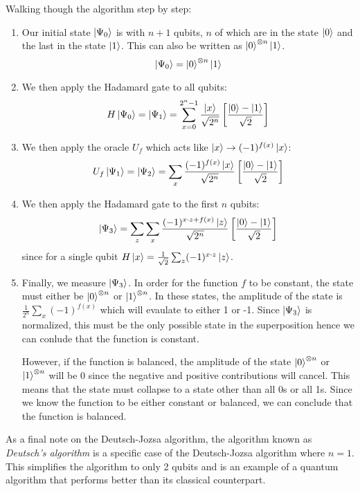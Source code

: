\documentclass[reqno]{amsart}
\numberwithin{equation}{section}
\numberwithin{figure}{section}
\begin{document}
\begin{justify}
Walking though the algorithm step by step:
    \begin{enumerate}
        \item Our initial state $\ket{\Psi_{0}}$ is with $n+1$ qubits, $n$ of which are in the state $\ket{0}$ and the last in the state $\ket{1}$. This can also be written as $\ket{0}^{\otimes n}\ket{1}$.
            \begin{equation}
                \ket{\Psi_{0}} = \ket{0}^{\otimes n}\ket{1}
            \end{equation}
        \item We then apply the Hadamard gate to all qubits:
            \begin{equation}
                H\ket{\Psi_{0}} = \ket{\Psi_{1}} = \sum\limits_{x=0}^{2^{n}-1}\frac{\ket{x}}{\sqrt{2^{n}}}\left[\frac{\ket{0} - \ket{1}}{\sqrt{2}}\right]
            \end{equation}
        \item We then apply the oracle $U_{f}$ which acts like $\ket{x} \rightarrow (-1)^{f(x)}\ket{x}$:
            \begin{equation}
                U_{f}\ket{\Psi_{1}} = \ket{\Psi_{2}} = \sum\limits_{x}\frac{(-1)^{f(x)}\ket{x}}{\sqrt{2^{n}}}\left[\frac{\ket{0} - \ket{1}}{\sqrt{2}}\right]
            \end{equation}
        \item We then apply the Hadamard gate to the first $n$ qubits:
            \begin{equation}
                \ket{\Psi_{3}} = \sum\limits_{z}\sum\limits_{x}\frac{(-1)^{x \cdot z + f(x)}\ket{z}}{\sqrt{2^{n}}}\left[\frac{\ket{0} - \ket{1}}{\sqrt{2}}\right] \label{eq:finalstate}
            \end{equation}
            since for a single qubit $H\ket{x} = \frac{1}{\sqrt{2}}\sum_{z}(-1)^{x \cdot z}\ket{z}$.
        \item Finally, we measure $\ket{\Psi_{3}}$. In order for the function $f$ to be constant, the state must either be $\ket{0}^{\otimes n}$ or $\ket{1}^{\otimes n}$. In these states, the amplitude of the state is $\frac{1}{2^{n}}\sum_{x}(-1)^{f(x)}$ which will evaulate to either 1 or -1. Since $\ket{\Psi_{3}}$ is normalized, this must be the only possible state in the superposition hence we can conlude that the function is constant.

            However, if the function is balanced, the amplitude of the state $\ket{0}^{\otimes n}$ or $\ket{1}^{\otimes n}$ will be 0 since the negative and positive contributions will cancel. This means that the state must collapse to a state other than all 0s or all 1s. Since we know the function to be either constant or balanced, we can conclude that the function is balanced.
    \end{enumerate}

As a final note on the Deutsch-Jozsa algorithm, the algorithm known as \textit{Deutsch's algorithm} is a specific case of the Deutsch-Jozsa algorithm where $n = 1$. This simplifies the algorithm to only 2 qubits and is an example of a quantum algorithm that performs better than its classical counterpart.
\end{justify}
\end{document}
